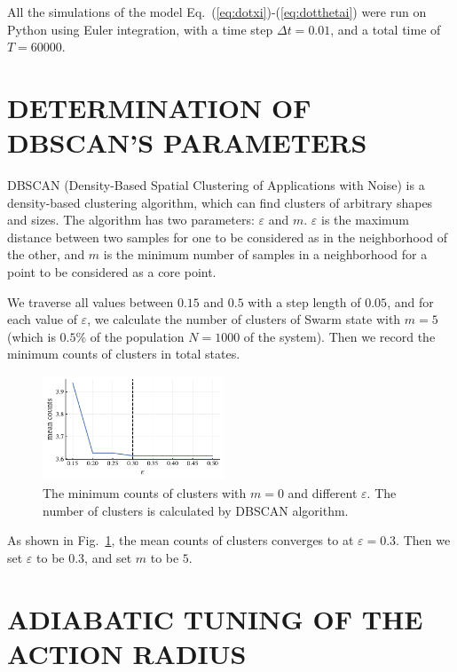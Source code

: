\documentclass[%
 aip,
 amsmath,amssymb,
 reprint,%
]{revtex4-1}
\begin{document}
All the simulations of the model Eq.~(\ref{eq:dotxi})-(\ref{eq:dotthetai}) were run on Python using Euler integration, with a time step $\Delta t=0.01$, and a total time of $T=60000$. 


\section{\label{sec:DBSCAN_param} DETERMINATION OF DBSCAN'S PARAMETERS}

DBSCAN (Density-Based Spatial Clustering of Applications with Noise) is a density-based clustering algorithm, which can find clusters of arbitrary shapes and sizes. The algorithm has two parameters: $\varepsilon$ and $m$. $\varepsilon$ is the maximum distance between two samples for one to be considered as in the neighborhood of the other, and $m$ is the minimum number of samples in a neighborhood for a point to be considered as a core point. 

We traverse all values between $0.15$ and $0.5$ with a step length of $0.05$, and for each value of $\varepsilon$, we calculate the number of clusters of Swarm state with $m=5$ (which is $0.5\%$ of the population $N=1000$ of the system). Then we record the minimum counts of clusters in total states. 

\begin{figure}[H]
    \includegraphics[width=0.48\textwidth]{./figs/DBSCANparam.pdf}
    \caption{
        \label{fig:DBSCANparam} The minimum counts of clusters with $m=0$ and different $\varepsilon$. The number of clusters is calculated by DBSCAN algorithm. 
    }
\end{figure}
As shown in Fig.~\ref{fig:DBSCANparam}, the mean counts of clusters converges to at $\varepsilon=0.3$. Then we set $\varepsilon$ to be $0.3$, and set $m$ to be $5$.

\section{\label{sec:Adiabatic} ADIABATIC TUNING OF THE ACTION RADIUS}
\end{document}
